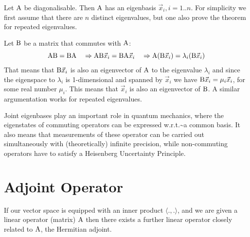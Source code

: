 \documentclass[
  a4paper,
  DIV=11,
  numbers=noendperiod,
  oneside]{scrreprt}
\theoremstyle{definition}
\theoremstyle{remark}
\newenvironment{fbx}[3]{\begin{tcolorbox}[enhanced, breakable,%
attach boxed title to top*={xshift=1.4pt},
boxed title style={boxrule=0.0mm, fuzzy shadow={1pt}{-1pt}{0mm}{0.1mm}{gray}, arc=.3em, rounded corners=east, sharp corners=west}, colframe=#1-color2, colbacktitle=#1-color1, colback = white, coltitle=black,  titlerule=0mm, toprule=0pt, bottomrule=.7pt, leftrule=.3em, rightrule=0pt, outer arc=.3em,  arc=0pt,	 sharp corners = east, left=.5em, bottomtitle=1mm, toptitle=1mm,title=\textbf{#2}\hspace{0.5em}{#3}]}
{\end{tcolorbox}}
\begin{document}
\label{Proofux2a-5.11}
\begin{fbx}{Proof}{Proof}{}
\label{Proof*-5.11}
Let \({\rm A}\) be diagonalisable. Then \({\rm A}\) has an eigenbasis
\(\vec{x}_i, i=1..n\). For simplicity we first assume that there are
\(n\) distinct eigenvalues, but one also prove the theorem for repeated
eigenvalues.

Let \({\rm B}\) be a matrix that commutes with \({\rm A}\):\\
\[ {\rm A B = B A} \quad \Rightarrow {\rm A B}\vec{x}_i ={\rm B A}\vec{x}_i \quad \Rightarrow {\rm A}({\rm  B}\vec{x}_i) = \lambda_i ({\rm B} \vec{x}_i)  \]
That means that \({\rm B} \vec{x}_i\) is also an eigenvector of
\({\rm A}\) to the eigenvalue \(\lambda_i\) and since the eigenspace to
\(\lambda_i\) is 1-dimensional and spanned by \(\vec{x}_i\) we have
\({\rm B} \vec{x}_i = \mu_i \vec{x}_i\), for some real number \(\mu_i\).
This means that \(\vec{x}_i\) is also an eigenvector of \({\rm B}\). A
similar argumentation works for repeated eigenvalues.

\end{fbx}

\begin{tcolorbox}[enhanced jigsaw, colframe=quarto-callout-note-color-frame, breakable, colbacktitle=quarto-callout-note-color!10!white, colback=white, left=2mm, opacityback=0, opacitybacktitle=0.6, coltitle=black, toptitle=1mm, bottomrule=.15mm, leftrule=.75mm, title=\textcolor{quarto-callout-note-color}{\faInfo}\hspace{0.5em}{Remark}, arc=.35mm, rightrule=.15mm, toprule=.15mm, titlerule=0mm, bottomtitle=1mm]

Joint eigenbases play an important role in quantum mechanics, where the
eigenstates of commuting operators can be expressed
w.r.t.\textasciitilde a common basis. It also means that measurements of
these operator can be carried out simultaneously with (theoretically)
infinite precision, while non-commuting operators have to satisfy a
Heisenberg Uncertainty Principle.

\end{tcolorbox}

\section{Adjoint Operator}\label{adjoint-operator}

If our vector space is equipped with an inner product
\(\langle . , . \rangle\), and we are given a linear operator (matrix)
\({\rm A}\) then there exists a further linear operator closely related
to \({\rm A}\), the Hermitian adjoint.
\end{document}
